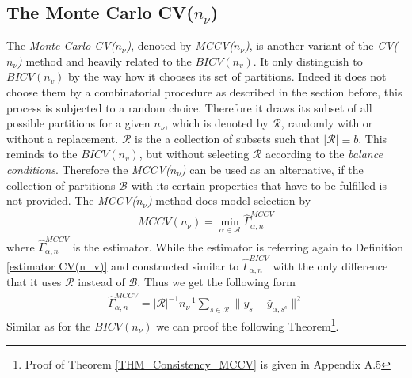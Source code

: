 \documentclass[Research_Module_ES.tex]{subfiles}
\begin{document}
\subsection{The Monte Carlo CV($n_\nu$)}
The \textit{Monte Carlo CV($n_\nu$)}, denoted by \textit{MCCV($n_\nu$)}, is another variant of the \textit{CV($n_\nu$)} method and heavily related to the $BICV(n_v)$. It only distinguish to $BICV(n_v)$ by the way how it chooses its set of partitions. Indeed it does not choose them by a combinatorial procedure as described in the section before, this process is subjected to a random choice. Therefore it draws its subset of all possible partitions for a given $n_\nu$, which is denoted by $\mathcal{R}$, randomly with or without a replacement. $\mathcal{R}$ is the a collection of subsets such that $|\mathcal{R}|\equiv b$. This reminds to the $BICV(n_v)$, but without selecting $\mathcal{R}$ according to the \textit{balance conditions}. Therefore the \textit{MCCV($n_\nu$)} can be used as an alternative, if the collection of partitions $\mathcal{B}$ with its certain properties that have to be fulfilled is not provided. The \textit{MCCV($n_\nu$)} method does model selection by 
\begin{align*}
MCCV(n_\nu)=\min_{\alpha\in\mathcal{A}}\hat{\Gamma}_{\alpha,n}^{MCCV}
\end{align*}
where $\hat{\Gamma}_{\alpha,n}^{MCCV}$ is the estimator. While the estimator is referring again to Definition \ref{estimator CV(n_v)} and constructed similar to $\hat{\Gamma}_{\alpha,n}^{BICV}$ with the only difference that it uses $\mathcal{R}$ instead of $\mathcal{B}$. Thus we get the following form
\begin{align*}
\hat{\Gamma}_{\alpha,n}^{MCCV}=|\mathcal{R}|^{-1}n_\nu^{-1}\sum_{s\in\mathcal{R}}\parallel y_s-\hat{y}_{\alpha,s^c}\parallel^2
\end{align*}
Similar as for the $BICV(n_\nu)$ we can proof the following Theorem\footnote{Proof of Theorem \ref{THM_Consistency_MCCV} is given in Appendix A.5}. 
\end{document}
